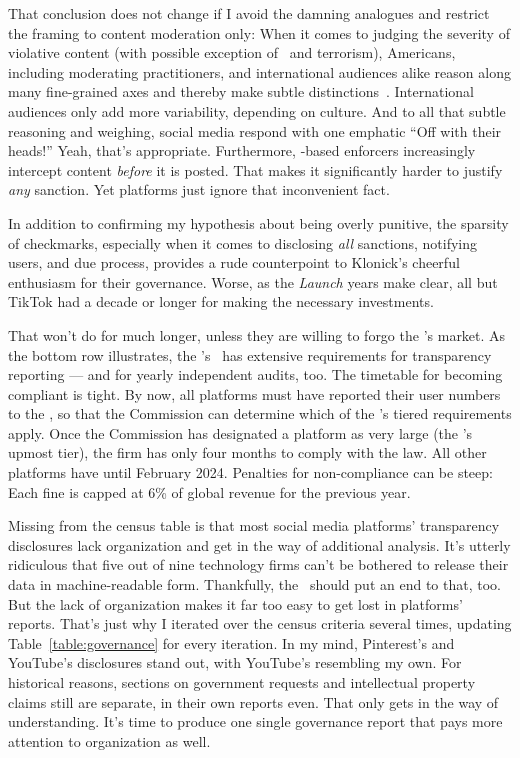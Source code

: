 That conclusion does not change if I avoid the damning analogues and restrict
the framing to content moderation only: When it comes to judging the severity of
violative content (with possible exception of \CSAM\ and terrorism), Americans,
including moderating practitioners, and international audiences alike reason
along many fine-grained axes and thereby make subtle
distinctions~\cite{JiangScheuermanea2021,ScheuermanJiangea2021}. International
audiences only add more variability, depending on culture. And to all that
subtle reasoning and weighing, social media respond with one emphatic ``Off with
their heads!'' Yeah, that's appropriate. Furthermore, \AI{}-based enforcers
increasingly intercept content \emph{before} it is posted. That makes it
significantly harder to justify \emph{any} sanction. Yet platforms just ignore
that inconvenient fact.

In addition to confirming my hypothesis about being overly punitive, the
sparsity of checkmarks, especially when it comes to disclosing \emph{all}
sanctions, notifying users, and due process, provides a rude counterpoint to
Klonick's cheerful enthusiasm for their governance. Worse, as the \emph{Launch}
years make clear, all but TikTok had a decade or longer for making the necessary
investments.

That won't do for much longer, unless they are willing to forgo the \EU's
market. As the bottom row illustrates, the \EU's \DSA\ has extensive
requirements for transparency reporting --- and for yearly independent audits,
too. The timetable for becoming compliant is tight. By now, all platforms must
have reported their user numbers to the \EU, so that the Commission can
determine which of the \DSA's tiered requirements apply. Once the Commission has
designated a platform as very large (the \DSA's upmost tier), the firm has only
four months to comply with the law. All other platforms have until February
2024. Penalties for non-compliance can be steep: Each fine is capped at 6\% of
global revenue for the previous year.

Missing from the census table is that most social media platforms' transparency
disclosures lack organization and get in the way of additional analysis. It's
utterly ridiculous that five out of nine technology firms can't be bothered to
release their data in machine-readable form. Thankfully, the \DSA\ should put an
end to that, too. But the lack of organization makes it far too easy to get lost
in platforms' reports. That's just why I iterated over the census criteria
several times, updating Table~\ref{table:governance} for every iteration. In my
mind, Pinterest's and YouTube's disclosures stand out, with YouTube's resembling
my own. For historical reasons, sections on government requests and intellectual
property claims still are separate, in their own reports even. That only gets in
the way of understanding. It's time to produce one single governance report that
pays more attention to organization as well.

